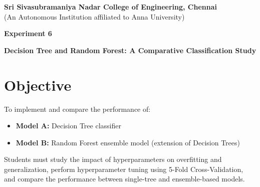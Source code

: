 \documentclass[11pt]{article}
\begin{document}
\begin{center}
    \Large \textbf{Sri Sivasubramaniya Nadar College of Engineering, Chennai} \\
    \large (An Autonomous Institution affiliated to Anna University) \\
    \vspace{0.3cm}
\end{center}

\begin{table}[H]
\renewcommand{\arraystretch}{1.4}
\end{table}


\begin{center}
    \textbf{\Large Experiment 6}
\end{center}

\begin{center}
    \textbf{Decision Tree and Random Forest: A Comparative Classification Study}
\end{center}


\section*{Objective}

To implement and compare the performance of:
\begin{itemize}
    \item \textbf{Model A:} Decision Tree classifier
    \item \textbf{Model B:} Random Forest ensemble model (extension of Decision Trees)
\end{itemize}

Students must study the impact of hyperparameters on overfitting and generalization, perform hyperparameter tuning using 5-Fold Cross-Validation, and compare the performance between single-tree and ensemble-based models.
\end{document}
